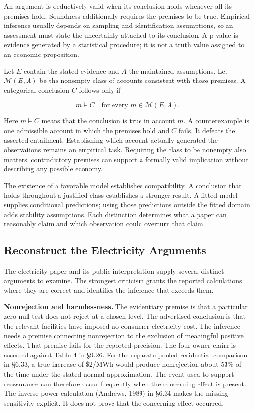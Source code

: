 \noindent \noindent An argument is deductively valid when its conclusion holds
whenever all its premises hold. Soundness additionally requires the
premises to be true. Empirical inference usually depends on sampling and
identification assumptions, so an assessment must state the uncertainty
attached to its conclusion. A p-value is evidence generated by a
statistical procedure; it is not a truth value assigned to an economic
proposition.

Let \(E\) contain the stated evidence and \(A\) the maintained
assumptions. Let \(\mathcal M(E,A)\) be the nonempty class of accounts
consistent with those premises. A categorical conclusion \(C\) follows
only if

\[
m\models C\quad\text{for every }m\in\mathcal M(E,A).
\]

Here \(m\models C\) means that the conclusion is true in account \(m\).
A counterexample is one admissible account in which the premises hold
and \(C\) fails. It defeats the asserted entailment. Establishing which
account actually generated the observations remains an empirical task.
Requiring the class to be nonempty also matters: contradictory premises
can support a formally valid implication without describing any possible
economy.

The existence of a favorable model establishes compatibility. A
conclusion that holds throughout a justified class establishes a
stronger result. A fitted model supplies conditional predictions; using
those predictions outside the fitted domain adds stability assumptions.
Each distinction determines what a paper can reasonably claim and which
observation could overturn that claim.

\hypertarget{M09-reconstruct-the-electricity-arguments}{%
\subsection{Reconstruct the Electricity
Arguments}\label{M09-reconstruct-the-electricity-arguments}}

\noindent \noindent The electricity paper and its public interpretation supply
several distinct arguments to examine. The strongest criticism grants
the reported calculations where they are correct and identifies the
inference that exceeds them.

\textbf{Nonrejection and harmlessness.} The evidentiary premise is that
a particular zero-null test does not reject at a chosen level. The
advertised conclusion is that the relevant facilities have imposed no
consumer electricity cost. The inference needs a premise connecting
nonrejection to the exclusion of meaningful positive effects. That
premise fails for the reported precision. The four-owner claim is
assessed against Table 4 in §9.26. For the separate pooled residential
comparison in §6.33, a true increase of \$2/MWh would produce
nonrejection about 53\% of the time under the stated normal
approximation. The event used to support reassurance can therefore occur
frequently when the concerning effect is present. The inverse-power
calculation (Andrews, 1989) in §6.34 makes the missing sensitivity
explicit. It does not prove that the concerning effect occurred.

